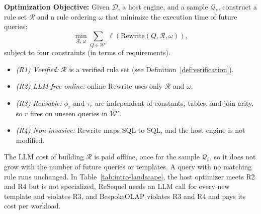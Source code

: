 \textbf{Optimization Objective:}
Given $\mathcal{D}$, a host engine, and a sample $\mathcal{Q}_s$, construct a rule set $\mathcal{R}$ and a rule ordering $\omega$ that minimize the execution time of future queries:
\begin{equation}
\min_{\mathcal{R},\,\omega} \sum_{Q \in \mathcal{W}'} \ell\!\left(\mathrm{Rewrite}(Q, \mathcal{R}, \omega)\right),
\end{equation}
subject to four constraints (in terms of requirements).
\begin{itemize}
\item \emph{(R1) Verified:} $\mathcal{R}$ is a verified rule set (see Definition~\ref{def:verification}).
\item \emph{(R2) LLM-free online:} online $\mathrm{Rewrite}$ uses only $\mathcal{R}$ and $\omega$.
\item \emph{(R3) Reusable:} $\phi_r$ and $\tau_r$ are independent of constants, tables, and join arity, so $r$ fires on unseen queries in $\mathcal{W}'$.
\item \emph{(R4) Non-invasive:} $\mathrm{Rewrite}$ maps SQL to SQL, and the host engine is not modified.
\end{itemize}
The LLM cost of building $\mathcal{R}$ is paid offline, once for the sample $\mathcal{Q}_s$, so it does not grow with the number of future queries or templates.
A query with no matching rule runs unchanged.
In Table~\ref{tab:intro-landscape}, the host optimizer meets R2 and R4 but is not specialized, ReSequel needs an LLM call for every new template and violates R3, and BespokeOLAP violates R3 and R4 and pays its cost per workload.